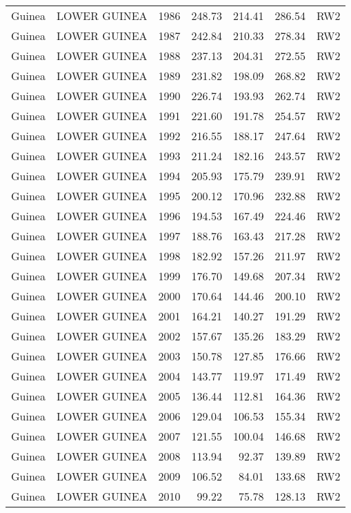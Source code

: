 \begin{longtable}{lllrrrl}
  Guinea & LOWER GUINEA & 1986 & 248.73 & 214.41 & 286.54 & RW2 \\ 
  Guinea & LOWER GUINEA & 1987 & 242.84 & 210.33 & 278.34 & RW2 \\ 
  Guinea & LOWER GUINEA & 1988 & 237.13 & 204.31 & 272.55 & RW2 \\ 
  Guinea & LOWER GUINEA & 1989 & 231.82 & 198.09 & 268.82 & RW2 \\ 
  Guinea & LOWER GUINEA & 1990 & 226.74 & 193.93 & 262.74 & RW2 \\ 
  Guinea & LOWER GUINEA & 1991 & 221.60 & 191.78 & 254.57 & RW2 \\ 
  Guinea & LOWER GUINEA & 1992 & 216.55 & 188.17 & 247.64 & RW2 \\ 
  Guinea & LOWER GUINEA & 1993 & 211.24 & 182.16 & 243.57 & RW2 \\ 
  Guinea & LOWER GUINEA & 1994 & 205.93 & 175.79 & 239.91 & RW2 \\ 
  Guinea & LOWER GUINEA & 1995 & 200.12 & 170.96 & 232.88 & RW2 \\ 
  Guinea & LOWER GUINEA & 1996 & 194.53 & 167.49 & 224.46 & RW2 \\ 
  Guinea & LOWER GUINEA & 1997 & 188.76 & 163.43 & 217.28 & RW2 \\ 
  Guinea & LOWER GUINEA & 1998 & 182.92 & 157.26 & 211.97 & RW2 \\ 
  Guinea & LOWER GUINEA & 1999 & 176.70 & 149.68 & 207.34 & RW2 \\ 
  Guinea & LOWER GUINEA & 2000 & 170.64 & 144.46 & 200.10 & RW2 \\ 
  Guinea & LOWER GUINEA & 2001 & 164.21 & 140.27 & 191.29 & RW2 \\ 
  Guinea & LOWER GUINEA & 2002 & 157.67 & 135.26 & 183.29 & RW2 \\ 
  Guinea & LOWER GUINEA & 2003 & 150.78 & 127.85 & 176.66 & RW2 \\ 
  Guinea & LOWER GUINEA & 2004 & 143.77 & 119.97 & 171.49 & RW2 \\ 
  Guinea & LOWER GUINEA & 2005 & 136.44 & 112.81 & 164.36 & RW2 \\ 
  Guinea & LOWER GUINEA & 2006 & 129.04 & 106.53 & 155.34 & RW2 \\ 
  Guinea & LOWER GUINEA & 2007 & 121.55 & 100.04 & 146.68 & RW2 \\ 
  Guinea & LOWER GUINEA & 2008 & 113.94 & 92.37 & 139.89 & RW2 \\ 
  Guinea & LOWER GUINEA & 2009 & 106.52 & 84.01 & 133.68 & RW2 \\ 
  Guinea & LOWER GUINEA & 2010 & 99.22 & 75.78 & 128.13 & RW2 \\ 

\end{longtable}
